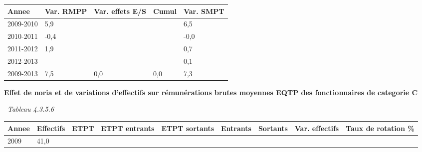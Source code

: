 \begin{longtable}[]{@{}lllll@{}}
\toprule
Annee & Var. RMPP & Var. effets E/S & Cumul & Var. SMPT\tabularnewline
\midrule
\endhead
2009-2010 & 5,9 & & & 6,5\tabularnewline
2010-2011 & -0,4 & & & -0,0\tabularnewline
2011-2012 & 1,9 & & & 0,7\tabularnewline
2012-2013 & & & & 0,1\tabularnewline
2009-2013 & 7,5 & 0,0 & 0,0 & 7,3\tabularnewline
\bottomrule
\end{longtable}

\textbf{Effet de noria et de variations d'effectifs sur rémunérations
brutes moyennes EQTP des fonctionnaires de categorie C}

~\emph{Tableau 4.3.5.6}

\begin{longtable}[]{@{}lllllllll@{}}
\toprule
\begin{minipage}[b]{0.05\columnwidth}\raggedright
Annee\strut
\end{minipage} & \begin{minipage}[b]{0.08\columnwidth}\raggedright
Effectifs\strut
\end{minipage} & \begin{minipage}[b]{0.04\columnwidth}\raggedright
ETPT\strut
\end{minipage} & \begin{minipage}[b]{0.10\columnwidth}\raggedright
ETPT entrants\strut
\end{minipage} & \begin{minipage}[b]{0.10\columnwidth}\raggedright
ETPT sortants\strut
\end{minipage} & \begin{minipage}[b]{0.07\columnwidth}\raggedright
Entrants\strut
\end{minipage} & \begin{minipage}[b]{0.07\columnwidth}\raggedright
Sortants\strut
\end{minipage} & \begin{minipage}[b]{0.11\columnwidth}\raggedright
Var. effectifs\strut
\end{minipage} & \begin{minipage}[b]{0.14\columnwidth}\raggedright
Taux de rotation \%\strut
\end{minipage}\tabularnewline
\midrule
\endhead
\begin{minipage}[t]{0.05\columnwidth}\raggedright
2009\strut
\end{minipage} & \begin{minipage}[t]{0.08\columnwidth}\raggedright
41,0\strut
\end{minipage} & \begin{minipage}[t]{0.04\columnwidth}\raggedright

\end{minipage}
\end{longtable}
